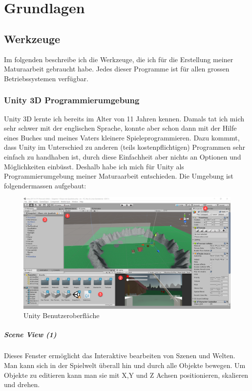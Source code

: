 \chapter{Grundlagen}

\section{Werkzeuge}
Im folgenden beschreibe ich die Werkzeuge, die ich für die Erstellung meiner Maturaarbeit gebraucht habe.
Jedes dieser Programme ist für allen grossen Betriebssystemen verfügbar.
\subsection{Unity 3D Programmierumgebung}

Unity 3D lernte ich bereits im Alter von 11 Jahren kennen.
Damals tat ich mich sehr schwer mit der englischen Sprache, konnte aber schon dann mit der Hilfe eines Buches und meines Vaters kleinere \glqq Spiele\grqq programmieren.
Dazu kommmt, dass Unity im Unterschied zu anderen (teils kostenpflichtigen) Programmen sehr einfach zu handhaben ist, durch diese Einfachheit aber nichts an Optionen und Möglichkeiten einbüsst.
Deshalb habe ich mich für Unity als Programmierumgebung meiner Maturaarbeit entschieden. Die Umgebung ist folgendermassen aufgebaut:

\begin{figure}[H]
\includegraphics[scale=0.4]{screenshots/unityide.png}
\caption{Unity Benutzeroberfläche}
\end{figure}

\paragraph{Scene View (1)}
Dieses Fenster ermöglicht das Interaktive bearbeiten von Szenen und Welten.
Man kann sich in der Spielwelt überall hin und durch alle Objekte bewegen. Um Objekte zu editieren kann man sie mit X,Y und Z Achsen positionieren,
skalieren und drehen.

